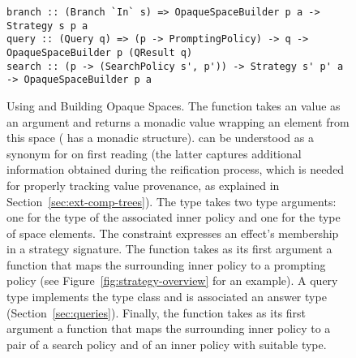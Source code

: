 \begin{figure}
\begin{ccodebox}
\begin{lstlisting}[style=haskell]
branch :: (Branch `In` s) => OpaqueSpaceBuilder p a -> Strategy s p a
query :: (Query q) => (p -> PromptingPolicy) -> q -> OpaqueSpaceBuilder p (QResult q)
search :: (p -> (SearchPolicy s', p')) -> Strategy s' p' a -> OpaqueSpaceBuilder p a
\end{lstlisting}
\end{ccodebox}
\vspace{-0.3cm}
\caption{Using and Building Opaque Spaces. The  function takes an  value as an argument and returns a monadic value wrapping an element from this space ( has a monadic structure).  can be understood as a synonym for  on first reading (the latter captures additional information obtained during the reification process, which is needed for properly tracking value provenance, as explained in Section~\ref{sec:ext-comp-trees}). The  type takes two type arguments: one for the type of the associated inner policy and one for the type of space elements. The  constraint expresses an effect's membership in a strategy signature. The  function takes as its first argument a function that maps the surrounding inner policy to a prompting policy (see Figure~\ref{fig:strategy-overview} for an example). A query type  implements the  type class and is associated an answer type  (Section~\ref{sec:queries}). Finally, the  function takes as its first argument a function that maps the surrounding inner policy to a pair of a search policy and of an inner policy with suitable type.}\label{fig:branch-query-search}
\end{figure}
